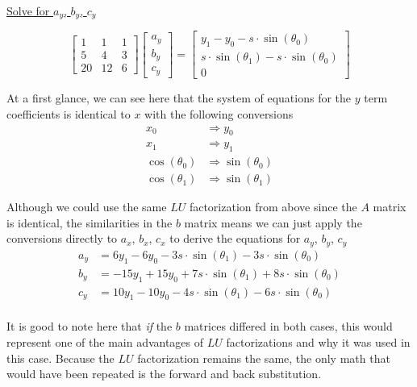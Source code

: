 \documentclass[12pt, letterpaper]{article}
\begin{document}
\newpage 
\underline{Solve for \(a_y\), \(b_y\), \(c_y\)}

\begin{equation*}
\begin{bmatrix}
1 & 1 & 1 \\
5 & 4 & 3 \\
20 & 12 & 6
\end{bmatrix}
\begin{bmatrix}
a_y \\ b_y \\ c_y
\end{bmatrix}
= \begin{bmatrix}
y_1 - y_0 - s \cdot \sin(\theta_0) \\
s \cdot \sin(\theta_1) - s \cdot \sin(\theta_0) \\
0
\end{bmatrix}
\end{equation*}

At a first glance, we can see here that the system of equations for the \(y\) term coefficients is identical to \(x\) with the following conversions 
\begin{align*}
x_0 &\Rightarrow y_0 \\
x_1 &\Rightarrow y_1 \\
\cos(\theta_0) &\Rightarrow \sin(\theta_0) \\
\cos(\theta_1) &\Rightarrow \sin(\theta_1)
\end{align*}

Although we could use the same \(LU\) factorization from above since the \(A\) matrix is identical, the similarities in the \(b\) matrix means we can just apply the conversions directly to \(a_x\), \(b_x\), \(c_x\) to derive the equations for \(a_y\), \(b_y\), \(c_y\)
\begin{align}
a_y &= 6y_1 - 6y_0 - 3s \cdot \sin(\theta_1) - 3s \cdot \sin(\theta_0) \\
b_y &= -15y_1 + 15y_0 + 7s \cdot \sin(\theta_1) + 8s \cdot \sin(\theta_0) \\
c_y &= 10y_1 - 10y_0 - 4s \cdot \sin(\theta_1) - 6s \cdot \sin(\theta_0) \\
\nonumber
\end{align}

It is good to note here that \textit{if} the \(b\) matrices differed in both cases, this would represent one of the main advantages of \(LU\) factorizations and why it was used in this case. Because the \(LU\) factorization remains the same, the only math that would have been repeated is the forward and back substitution.
\end{document}
